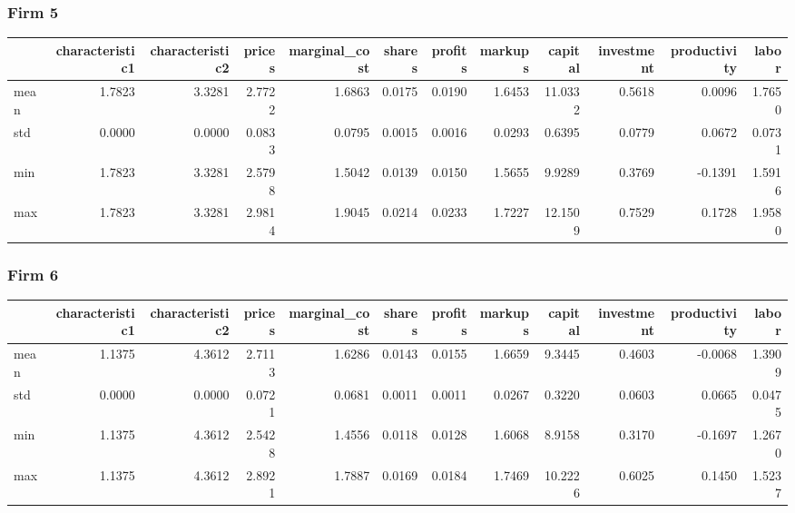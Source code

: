  \subsubsection*{Firm 5}
\begin{tabular}{lrrrrrrrrrrr}
\toprule
{} &  characteristic1 &  characteristic2 &  prices &  marginal\_cost &  shares &  profits &  markups &  capital &  investment &  productivity &  labor \\
\midrule
mean &           1.7823 &           3.3281 &  2.7722 &         1.6863 &  0.0175 &   0.0190 &   1.6453 &  11.0332 &      0.5618 &        0.0096 & 1.7650 \\
std  &           0.0000 &           0.0000 &  0.0833 &         0.0795 &  0.0015 &   0.0016 &   0.0293 &   0.6395 &      0.0779 &        0.0672 & 0.0731 \\
min  &           1.7823 &           3.3281 &  2.5798 &         1.5042 &  0.0139 &   0.0150 &   1.5655 &   9.9289 &      0.3769 &       -0.1391 & 1.5916 \\
max  &           1.7823 &           3.3281 &  2.9814 &         1.9045 &  0.0214 &   0.0233 &   1.7227 &  12.1509 &      0.7529 &        0.1728 & 1.9580 \\
\bottomrule
\end{tabular}


 \subsubsection*{Firm 6}
\begin{tabular}{lrrrrrrrrrrr}
\toprule
{} &  characteristic1 &  characteristic2 &  prices &  marginal\_cost &  shares &  profits &  markups &  capital &  investment &  productivity &  labor \\
\midrule
mean &           1.1375 &           4.3612 &  2.7113 &         1.6286 &  0.0143 &   0.0155 &   1.6659 &   9.3445 &      0.4603 &       -0.0068 & 1.3909 \\
std  &           0.0000 &           0.0000 &  0.0721 &         0.0681 &  0.0011 &   0.0011 &   0.0267 &   0.3220 &      0.0603 &        0.0665 & 0.0475 \\
min  &           1.1375 &           4.3612 &  2.5428 &         1.4556 &  0.0118 &   0.0128 &   1.6068 &   8.9158 &      0.3170 &       -0.1697 & 1.2670 \\
max  &           1.1375 &           4.3612 &  2.8921 &         1.7887 &  0.0169 &   0.0184 &   1.7469 &  10.2226 &      0.6025 &        0.1450 & 1.5237 \\
\bottomrule
\end{tabular}


